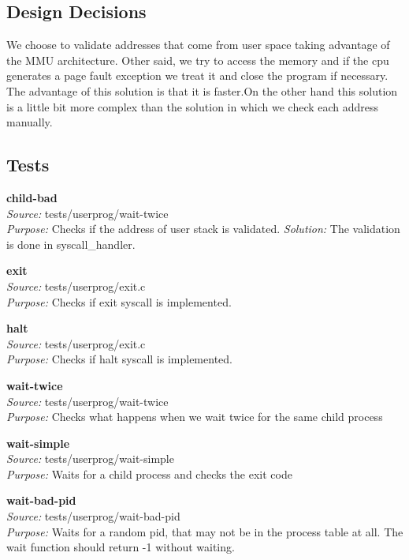     \subsection{Design Decisions}

	We choose to validate addresses that come from user space taking advantage of the MMU architecture. Other said, we try to access the memory and if the cpu generates a page fault exception we treat it and close the program if necessary. The advantage of this solution is that it is faster.On the other hand this solution is a little bit more complex than the solution in which we check each address manually.

    \subsection{Tests}

      \textbf{child-bad}\\
      \textit{Source:} tests/userprog/wait-twice\\
      \textit{Purpose:} Checks if the address of user stack is validated.
      \textit{Solution:} The validation is done in syscall\_handler.

      \textbf{exit}\\
      \textit{Source:} tests/userprog/exit.c\\
      \textit{Purpose:} Checks if exit syscall is implemented.

      \textbf{halt}\\
      \textit{Source:} tests/userprog/exit.c\\
      \textit{Purpose:} Checks if halt syscall is implemented.
      
      \textbf{wait-twice}\\
      \textit{Source:} tests/userprog/wait-twice\\
      \textit{Purpose:} Checks what happens when we wait twice for the same child process

      \textbf{wait-simple}\\
      \textit{Source:} tests/userprog/wait-simple\\
      \textit{Purpose:} Waits for a child process and checks the exit code

      \textbf{wait-bad-pid} \\
      \textit{Source:} tests/userprog/wait-bad-pid\\
      \textit{Purpose:} Waits for a random pid, that may not be in the process table at all. The wait function should return -1 without waiting.
    

